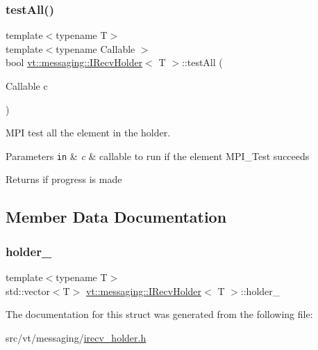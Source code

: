 \subsubsection{\texorpdfstring{test\+All()}{testAll()}}
{\footnotesize\ttfamily template$<$typename T$>$ \\
template$<$typename Callable $>$ \\
bool \hyperlink{structvt_1_1messaging_1_1_i_recv_holder}{vt\+::messaging\+::\+I\+Recv\+Holder}$<$ T $>$\+::test\+All (\begin{DoxyParamCaption}\item[{Callable}]{c }\end{DoxyParamCaption})\hspace{0.3cm}{\ttfamily [inline]}}



M\+PI test all the element in the holder. 


\begin{DoxyParams}[1]{Parameters}
\mbox{\tt in}  & {\em c} & callable to run if the element {\ttfamily M\+P\+I\+\_\+\+Test} succeeds\\
\hline
\end{DoxyParams}
\begin{DoxyReturn}{Returns}
if progress is made 
\end{DoxyReturn}


\subsection{Member Data Documentation}
\mbox{\label{structvt_1_1messaging_1_1_i_recv_holder_ad906203e102f9180b56d66393bd47c55}} 
\subsubsection{\texorpdfstring{holder\+\_\+}{holder\_}}
{\footnotesize\ttfamily template$<$typename T$>$ \\
std\+::vector$<$T$>$ \hyperlink{structvt_1_1messaging_1_1_i_recv_holder}{vt\+::messaging\+::\+I\+Recv\+Holder}$<$ T $>$\+::holder\+\_\+\hspace{0.3cm}{\ttfamily [private]}}



The documentation for this struct was generated from the following file\+:\begin{DoxyCompactItemize}
\item 
src/vt/messaging/\hyperlink{irecv__holder_8h}{irecv\+\_\+holder.\+h}\end{DoxyCompactItemize}

